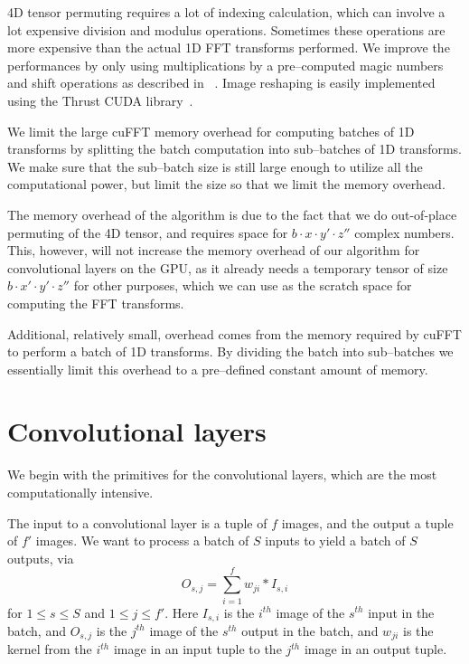 \documentclass[conference]{./IEEEtran}
\begin{document}
  4D tensor permuting requires a lot of indexing calculation, which
  can involve a lot expensive division and modulus operations.
  Sometimes these operations are more expensive than the actual 1D FFT
  transforms performed.  We improve the performances by only using
  multiplications by a pre--computed magic numbers and shift
  operations as described in ~\cite{warren2013hacker}.  Image
  reshaping is easily implemented using the Thrust CUDA
  library~\cite{bell2011thrust}.

  We limit the large cuFFT memory overhead for computing batches of 1D
  transforms by splitting the batch computation into sub--batches of
  1D transforms.  We make sure that the sub--batch size is still large
  enough to utilize all the computational power, but limit the size so
  that we limit the memory overhead.

  The memory overhead of the algorithm is due to the fact that we do
  out-of-place permuting of the 4D tensor, and requires space for $b
  \cdot x \cdot y' \cdot z''$ complex numbers.  This, however, will
  not increase the memory overhead of our algorithm for convolutional
  layers on the GPU, as it already needs a temporary tensor of size $b
  \cdot x' \cdot y' \cdot z''$ for other purposes, which we can use as
  the scratch space for computing the FFT transforms.

  Additional, relatively small, overhead comes from the memory
  required by cuFFT to perform a batch of 1D transforms.  By dividing
  the batch into sub--batches we essentially limit this overhead to a
  pre--defined constant amount of memory.


\section{Convolutional layers}

  We begin with the primitives for the convolutional layers, which are
  the most computationally intensive.

  The input to a convolutional layer is a tuple of $f$ images, and the
  output a tuple of $f'$ images.  We want to process a batch of $S$
  inputs to yield a batch of $S$ outputs, via
  \[
  O_{s,j} = \sum_{i=1}^f w_{ji}\ast I_{s,i}
  \]
  for $1 \le s \le S$ and $1 \le j \le f'$.  Here $I_{s,i}$ is the
  $i^{th}$ image of the $s^{th}$ input in the batch, and $O_{s,j}$ is
  the $j^{th}$ image of the $s^{th}$ output in the batch, and $w_{ji}$
  is the kernel from the $i^{th}$ image in an input tuple to the
  $j^{th}$ image in an output tuple.
\end{document}
